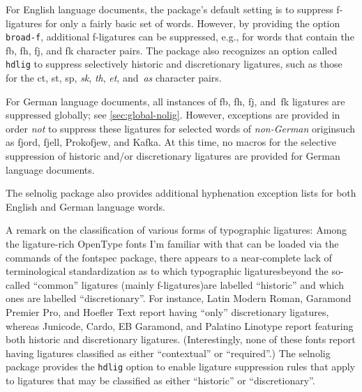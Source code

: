 \documentclass[12pt]{article}
\newcommand{\pkg}[1]{\textsf{#1}}
\newcommand{\opt}[1]{\texttt{#1}}
\begin{document}
For English language documents, the package's default setting is to suppress f-ligatures for only a fairly basic set of words. However, by providing the option \opt{broad-f}, additional f-ligatures can be suppressed, e.g., for words that contain the {\ebg \mbox{fb}, \mbox{fh}, \mbox{fj}, and \mbox{fk}} character pairs. The package also recognizes an option called \opt{hdlig} to suppress selectively historic and discretionary ligatures, such as those for the ct, st, sp, {\ebg\emph{sk}}, \emph{th}, \emph{et}, and~\emph{as} character pairs. 


For German language documents, all instances of {\ebg \mbox{fb}, \mbox{fh}, \mbox{fj}, and~\mbox{fk}} ligatures are suppressed globally; see \cref{sec:global-nolig}. However, exceptions are provided in order \emph{not} to suppress these ligatures for selected words of \emph{non-German} origin\textemdash such as fjord, fjell, Prokofjew, and {\ebg Kafka}. At this time, no macros for the selective suppression of historic and/or discretionary ligatures are provided for German language documents.


The \pkg{selnolig} package also provides additional hyphenation exception lists for both English and German language words.

A remark on the classification of various forms of typographic ligatures: Among the ligature-rich OpenType fonts I'm familiar with that can be loaded via the commands of the \pkg{fontspec} package, there appears to a near-complete lack of terminological standardization as to which typographic ligatures\textemdash beyond the so-called \enquote{common} ligatures (mainly f-ligatures)\textemdash are labelled \enquote{historic} and which ones are labelled \enquote{discretionary}. For instance, Latin Modern Roman, Garamond Premier Pro, and Hoefler Text report having \enquote{only} discretionary ligatures, whereas Junicode, Cardo, EB Garamond, and Palatino Linotype report featuring both historic and discretionary ligatures. (Interestingly, none of these fonts report having ligatures classified as either \enquote{contextual} or \enquote{required}.) The \pkg{selnolig} package provides the \opt{hdlig} option to enable ligature suppression rules that apply to ligatures that may be classified as either \enquote{historic} or \enquote{discretionary}.
\end{document}
